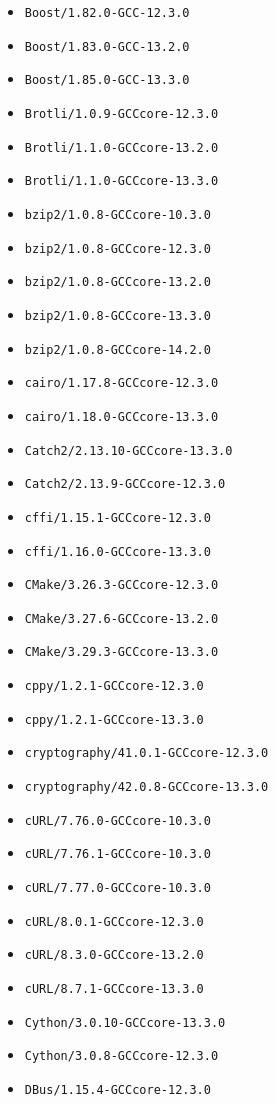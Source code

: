 \begin{multicols}{3}
\begin{itemize}
\item \verb|Boost/1.82.0-GCC-12.3.0|
\item \verb|Boost/1.83.0-GCC-13.2.0|
\item \verb|Boost/1.85.0-GCC-13.3.0|
\item \verb|Brotli/1.0.9-GCCcore-12.3.0|
\item \verb|Brotli/1.1.0-GCCcore-13.2.0|
\item \verb|Brotli/1.1.0-GCCcore-13.3.0|
\item \verb|bzip2/1.0.8-GCCcore-10.3.0|
\item \verb|bzip2/1.0.8-GCCcore-12.3.0|
\item \verb|bzip2/1.0.8-GCCcore-13.2.0|
\item \verb|bzip2/1.0.8-GCCcore-13.3.0|
\item \verb|bzip2/1.0.8-GCCcore-14.2.0|
\item \verb|cairo/1.17.8-GCCcore-12.3.0|
\item \verb|cairo/1.18.0-GCCcore-13.3.0|
\item \verb|Catch2/2.13.10-GCCcore-13.3.0|
\item \verb|Catch2/2.13.9-GCCcore-12.3.0|
\item \verb|cffi/1.15.1-GCCcore-12.3.0|
\item \verb|cffi/1.16.0-GCCcore-13.3.0|
\item \verb|CMake/3.26.3-GCCcore-12.3.0|
\item \verb|CMake/3.27.6-GCCcore-13.2.0|
\item \verb|CMake/3.29.3-GCCcore-13.3.0|
\item \verb|cppy/1.2.1-GCCcore-12.3.0|
\item \verb|cppy/1.2.1-GCCcore-13.3.0|
\item \verb|cryptography/41.0.1-GCCcore-12.3.0|
\item \verb|cryptography/42.0.8-GCCcore-13.3.0|
\item \verb|cURL/7.76.0-GCCcore-10.3.0|
\item \verb|cURL/7.76.1-GCCcore-10.3.0|
\item \verb|cURL/7.77.0-GCCcore-10.3.0|
\item \verb|cURL/8.0.1-GCCcore-12.3.0|
\item \verb|cURL/8.3.0-GCCcore-13.2.0|
\item \verb|cURL/8.7.1-GCCcore-13.3.0|
\item \verb|Cython/3.0.10-GCCcore-13.3.0|
\item \verb|Cython/3.0.8-GCCcore-12.3.0|
\item \verb|DBus/1.15.4-GCCcore-12.3.0|

\end{itemize}
\end{multicols}
